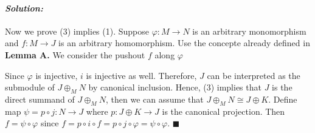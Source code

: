 \documentclass[12pt, a4paper]{article}
\theoremstyle{remark}
\newenvironment{solution}
  {\paragraph{\textit{Solution:}}\par\medskip}
  {\hfill$\blacksquare$\vspace{0.1cm}}
\begin{document}
\begin{solution}
Now we prove (3) implies (1).  Suppose $\varphi:M\to N$ is an arbitrary monomorphism and $f:M\to J$ is an arbitrary homomorphism. 
Use the concepte already defined in \textbf{Lemma A.}
We consider the pushout $f$ along $\varphi$
\begin{center}
\end{center}
Since $\varphi$ is injective, $i$ is injective as well. Therefore, $J$ can be interpreted as the submodule of $J\oplus_{M}N$ by canonical inclusion. 
Hence, (3) implies that $J$ is the direct summand of $J\oplus_{M}N$, then we can assume that $J\oplus_{M}N\cong J\oplus K$. Define map $\psi=p\circ j:N\to J$ where 
$p:J\oplus K\to J$ is the canonical projection. Then $f=\psi\circ \varphi$ since $f=p\circ i\circ f = p\circ j\circ \varphi = \psi\circ \varphi$.
\end{solution}
\end{document}
